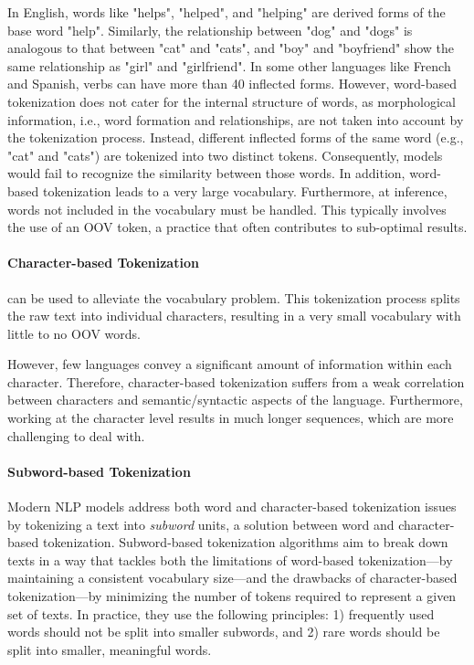 In English, words like "helps", "helped", and "helping" are derived forms of the base word "help". Similarly, the relationship between "dog" and "dogs" is analogous to that between "cat" and "cats", and "boy" and "boyfriend" show the same relationship as "girl" and "girlfriend". In some other languages like French and Spanish, verbs can have more than 40 inflected forms. However, word-based tokenization does not cater for the internal structure of words, as morphological information, i.e., word formation and relationships, are not taken into account by the tokenization process. Instead, different inflected forms of the same word (e.g., "cat" and "cats") are tokenized into two distinct tokens. Consequently, models would fail to recognize the similarity between those words. In addition, word-based tokenization leads to a very large vocabulary. Furthermore, at inference, words not included in the vocabulary must be handled. This typically involves the use of an \ac{OOV} token, a practice that often contributes to sub-optimal results.

\paragraph{Character-based Tokenization} \citep{wehrmann2017character} can be used to alleviate the vocabulary problem. This tokenization process splits the raw text into individual characters, resulting in a very small vocabulary with little to no \ac{OOV} words. 

However, few languages convey a significant amount of information within each character. Therefore, character-based tokenization suffers from a weak correlation between characters and semantic/syntactic aspects of the language. Furthermore, working at the character level results in much longer sequences, which are more challenging to deal with.

\paragraph{Subword-based Tokenization} Modern \ac{NLP} models address both word and character-based tokenization issues by tokenizing a text into \textit{subword} units, a solution between word and character-based tokenization. Subword-based tokenization algorithms aim to break down texts in a way that tackles both the limitations of word-based tokenization—by maintaining a consistent vocabulary size—and the drawbacks of character-based tokenization—by minimizing the number of tokens required to represent a given set of texts. In practice, they use the following principles: 1) frequently used words should not be split into smaller subwords, and 2) rare words should be split into smaller, meaningful words. 

